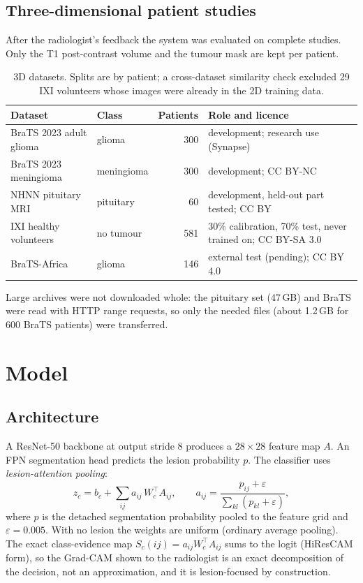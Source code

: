 \documentclass[11pt,a4paper]{article}
\begin{document}
\subsection{Three-dimensional patient studies}
After the radiologist's feedback the system was evaluated on complete studies. Only the T1 post-contrast volume and the
tumour mask are kept per patient.
\begin{table}[H]\centering\small
\begin{tabularx}{\linewidth}{@{}llrX@{}}
\toprule
\textbf{Dataset} & \textbf{Class} & \textbf{Patients} & \textbf{Role and licence} \\
\midrule
BraTS 2023 adult glioma & glioma & 300 & development; research use (Synapse) \\
BraTS 2023 meningioma & meningioma & 300 & development; CC BY-NC \\
NHNN pituitary MRI & pituitary & 60 & development, held-out part tested; CC BY \\
IXI healthy volunteers & no tumour & 581 & 30\% calibration, 70\% test, never trained on; CC BY-SA 3.0 \\
BraTS-Africa & glioma & 146 & external test (pending); CC BY 4.0 \\
\bottomrule
\end{tabularx}
\caption{3D datasets. Splits are by patient; a cross-dataset similarity check excluded 29 IXI volunteers whose
images were already in the 2D training data.}
\end{table}
Large archives were not downloaded whole: the pituitary set (47\,GB) and BraTS were read with HTTP range requests, so
only the needed files (about 1.2\,GB for 600 BraTS patients) were transferred.

\section{Model}\label{sec:model}
\subsection{Architecture}
A ResNet-50 backbone at output stride 8 produces a $28\times28$ feature map $A$. An FPN segmentation head predicts the
lesion probability $p$. The classifier uses \emph{lesion-attention pooling}:
\begin{equation}
z_c = b_c + \sum_{ij} a_{ij}\, W_c^{\top} A_{ij}, \qquad a_{ij} = \frac{p_{ij} + \varepsilon}{\sum_{kl} (p_{kl} + \varepsilon)},
\end{equation}
where $p$ is the detached segmentation probability pooled to the feature grid and $\varepsilon = 0.005$. With no lesion
the weights are uniform (ordinary average pooling). The exact class-evidence map $S_c(ij) = a_{ij} W_c^{\top} A_{ij}$
sums to the logit (HiResCAM form), so the Grad-CAM shown to the radiologist is an exact decomposition of the decision,
not an approximation, and it is lesion-focused by construction.
\end{document}
